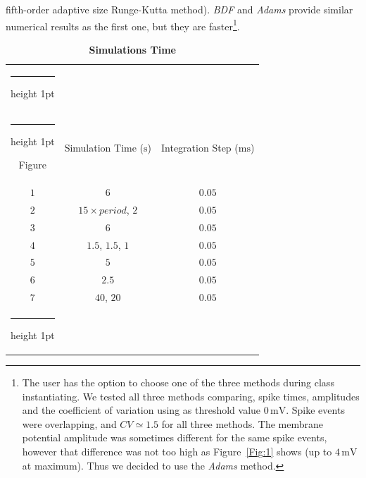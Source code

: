 \documentclass[10pt,a4paper,onecolumn]{article}
\makeatletter
\newcommand{\Rm}[1]{\mathrm{#1}}
\newcommand{\thickhline}{%
    \noalign {\ifnum 0=`}\fi \hrule height 1pt
    \futurelet \reserved@a \@xhline
}
\makeatother
\begin{document}
fifth-order adaptive size Runge-Kutta method). \emph{BDF} and \emph{Adams}
provide similar numerical results as the first one, but they are
faster\footnote{The user has the option to choose one of the three methods
    during class instantiating. We tested all three methods comparing, spike
    times, amplitudes and the coefficient of variation using as threshold value
    $0\, \Rm{mV}$. Spike events were overlapping, and $CV \simeq 1.5$ for all
    three methods. The membrane potential amplitude was sometimes different
    for the same spike events, however that difference was not too high as
    Figure~\ref{Fig:1} shows (up to $4\, \Rm{mV}$ at maximum). Thus we decided
    to use the \emph{Adams} method.}.
\begin{table}[!htbp]
    \centering
    \begin{tabular}{ccc}
        \thickhline
        \multicolumn{3}{c}{Simulation Time} \\ \thickhline
        Figure & Simulation Time ($\Rm{s}$) & Integration Step ($\Rm{ms}$) \\ 
        \rowcolor{LightGray}
        $1$ & $6$ & $0.05$ \\ \rowcolor{Gray}
        $2$ & $15\times period$, $2$ & $0.05$ \\ \rowcolor{LightGray}
        $3$ & $6$ & $0.05$ \\ \rowcolor{Gray} 
        $4$ & $1.5$, $1.5$, $1$ & $0.05$ \\ \rowcolor{LightGray} 
        $5$ & $5$ & $0.05$  \\ \rowcolor{Gray} 
        $6$ & $2.5$ & $0.05$  \\ \rowcolor{LightGray} 
        $7$ & $40$, $20$ & $0.05$  \\ \thickhline
    \end{tabular}
    \caption{{\bfseries \sffamily Simulations Time}}
    \label{Table:2}
\end{table}
\end{document}
